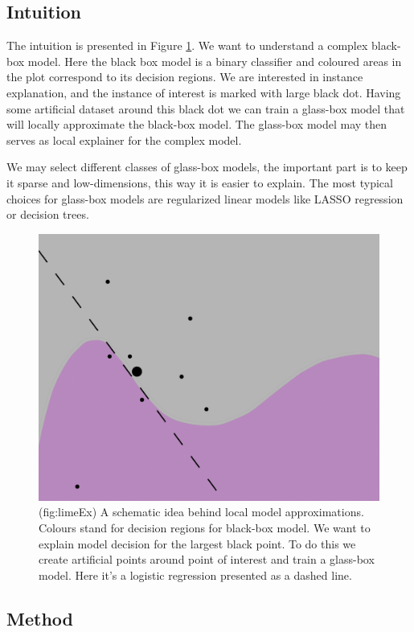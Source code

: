 \documentclass[12pt,]{krantz}
\theoremstyle{definition}
\theoremstyle{definition}
\theoremstyle{definition}
\theoremstyle{remark}
\begin{document}
\hypertarget{intuition-3}{%
\subsection{Intuition}\label{intuition-3}}

The intuition is presented in Figure \ref{fig:limeEx}. We want to
understand a complex black-box model. Here the black box model is a
binary classifier and coloured areas in the plot correspond to its
decision regions. We are interested in instance explanation, and the
instance of interest is marked with large black dot. Having some
artificial dataset around this black dot we can train a glass-box model
that will locally approximate the black-box model. The glass-box model
may then serves as local explainer for the complex model.

We may select different classes of glass-box models, the important part
is to keep it sparse and low-dimensions, this way it is easier to
explain. The most typical choices for glass-box models are regularized
linear models like LASSO regression or decision trees.

\begin{figure}

{\centering \includegraphics[width=0.7\linewidth]{figure/limeEx} 

}

\caption{(fig:limeEx) A schematic idea behind local model approximations. Colours stand for decision regions for black-box model. We want to explain model decision for the largest black point. To do this we create artificial points around point of interest and train a glass-box model. Here it's a logistic regression presented as a dashed line.}\label{fig:limeEx}
\end{figure}

\hypertarget{method-3}{%
\subsection{Method}\label{method-3}}
\end{document}
